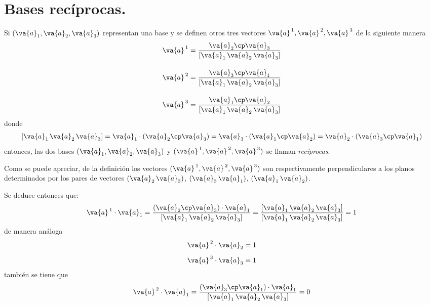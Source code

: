 \section{Bases recíprocas.}
Si $(\va{a}_{1}, \va{a}_{2}, \va{a}_{3})$ representan una base y se definen otros tres vectores $\va{a}^{\, 1}, \va{a}^{\, 2}, \va{a}^{\, 3}$ de la siguiente manera
\begin{align}
\begin{aligned}
\va{a}^{\, 1}&= \dfrac{\va{a}_{2} \cp \va{a}_{3}}{[\va{a}_{1} \, \va{a}_{2} \, \va{a}_{3}]} \\[1em]
\va{a}^{\, 2} &= \dfrac{\va{a}_{3} \cp \va{a}_{1}}{[\va{a}_{1} \, \va{a}_{2} \, \va{a}_{3}]}  \\[1em]
\va{a}^{\, 3} &= \dfrac{\va{a}_{1} \cp \va{a}_{2}}{[\va{a}_{1} \, \va{a}_{2} \, \va{a}_{3}]} 
\end{aligned}
\label{eq:ecuacion_02_01}
\end{align}
donde
\begin{align*}
\left[ \va{a}_{1} \, \va{a}_{2} \, \va{a}_{3} \right] = \va{a}_{1} \cdot (\va{a}_{2} \cp \va{a}_{3}) = \va{a}_{3} \cdot (\va{a}_{1} \cp \va{a}_{2}) = \va{a}_{2} \cdot (\va{a}_{3} \cp \va{a}_{1})
\end{align*}
entonces, las dos bases $(\va{a}_{1}, \va{a}_{2}, \va{a}_{3})$ y $(\va{a}^{\, 1}, \va{a}^{\, 2}, \va{a}^{\, 3})$ se llaman \emph{recíprocas}.
\par
Como se puede apreciar, de la definición los vectores $(\va{a}^{\, 1}, \va{a}^{\, 2}, \va{a}^{\, 3})$ son respectivamente perpendiculares a los planos determinados por los pares de vectores $(\va{a}_{2} \, \va{a}_{3})$,  $(\va{a}_{3} \, \va{a}_{1})$, $(\va{a}_{1} \, \va{a}_{2})$.
\par
Se deduce entonces que:
\begin{align}
\va{a}^{\, 1} \cdot \va{a}_{1} = \dfrac{(\va{a}_{2} \cp \va{a}_{3}) \cdot \va{a}_{1}}{\left[ \va{a}_{1} \, \va{a}_{2} \, \va{a}_{3} \right]} = \dfrac{\left[ \va{a}_{1} \, \va{a}_{2} \, \va{a}_{3} \right]}{\left[ \va{a}_{1} \, \va{a}_{2} \, \va{a}_{3} \right]} = 1
\label{ec:ecuacion_02_02}
\end{align}
de manera análoga
\begin{align*}
\va{a}^{\, 2} \cdot \va{a}_{2} &= 1 \\[0.5em]
\va{a}^{\, 3} \cdot \va{a}_{3} &= 1
\end{align*}
también se tiene que
\begin{align*}
\va{a}^{\, 2} \cdot \va{a}_{1} = \dfrac{(\va{a}_{3} \cp \va{a}_{1}) \cdot \va{a}_{1}}{\left[ \va{a}_{1} \, \va{a}_{2} \, \va{a}_{3} \right]} = 0
\end{align*}
